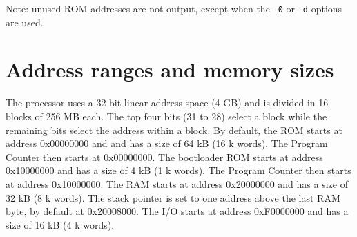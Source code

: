 \documentclass[12pt]{article}
\begin{document}
Note: unused ROM addresses are not output, except when the \lstinline|-0| or \lstinline|-d| options are used.
%
%

\section{Address ranges and memory sizes}
The processor uses a 32-bit linear address space (4 GB) and is divided in 16 blocks of 256 MB each. The top four bits (31 to 28) select a block while the remaining bits select the address within a block.
By default, the ROM starts at address 0x00000000 and and has a size of 64 kB (16 k words). The Program Counter then starts at 0x00000000. The bootloader ROM starts at address 0x10000000 and has a size of 4 kB (1 k words). The Program Counter then starts at address 0x10000000. The RAM starts at address 0x20000000 and has a size of 32 kB (8 k words). The stack pointer is set to one address above the last RAM byte, by default at 0x20008000. The I/O starts at address 0xF0000000 and has a size of 16 kB (4 k words).
\end{document}
